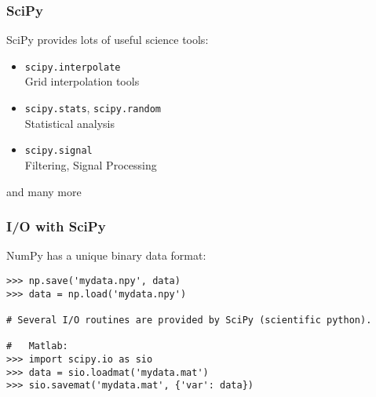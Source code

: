 \begin{frame}[fragile]
    \frametitle{SciPy}

    SciPy provides lots of useful science tools:
    \begin{itemize}
        \item \lstinline|scipy.interpolate|\\
            Grid interpolation tools
        \item \lstinline|scipy.stats|, \lstinline|scipy.random|\\
            Statistical analysis
        \item \lstinline|scipy.signal|\\
            Filtering, Signal Processing
    \end{itemize}
    and many more
\end{frame}

\begin{frame}[fragile]\frametitle{I/O with SciPy}
    
    NumPy has a unique binary data format:
    \begin{lstlisting}
>>> np.save('mydata.npy', data)
>>> data = np.load('mydata.npy')

# Several I/O routines are provided by SciPy (scientific python).

#   Matlab:
>>> import scipy.io as sio
>>> data = sio.loadmat('mydata.mat')
>>> sio.savemat('mydata.mat', {'var': data})
    \end{lstlisting}
\end{frame}
